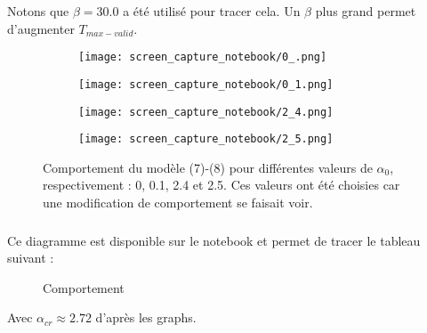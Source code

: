 \documentclass[10pt,a4paper]{report}
\begin{document}
	Notons que $\beta = 30.0$ a été utilisé pour tracer cela. Un $\beta$ plus grand permet d'augmenter $T_{max-valid}$.
	
	\begin{figure}
		\centering
		\begin{subfigure}{}
        	\texttt{[image: screen\_capture\_notebook/0\_.png]}
    	\end{subfigure}
		\centering  	
   		\begin{subfigure}{}
        	\texttt{[image: screen\_capture\_notebook/0\_1.png]}
    	\end{subfigure}
    	\centering   		

   		\begin{subfigure}{}
        	\texttt{[image: screen\_capture\_notebook/2\_4.png]}
    	\end{subfigure}
    	\centering   		
   		\begin{subfigure}{}
        	\texttt{[image: screen\_capture\_notebook/2\_5.png]}
    	\end{subfigure}
   	\caption{Comportement du modèle (7)-(8) pour différentes valeurs de $\alpha_0$, respectivement : 0, 0.1, 2.4 et 2.5. Ces valeurs ont été choisies car une modification de comportement se faisait voir.}
    \label{fig:comportement_model_alpha}
	\end{figure}
	
	\subsubsection{} %

	Ce diagramme est disponible sur le notebook et permet de tracer le tableau suivant :

	
	\begin{figure}
	\centering
	\caption{Comportement }
	\label{fig:tableau de signe}
	\end{figure}
	
	Avec $\alpha_{cr} \approx 2.72$ d'après les graphs.
	
\end{document}
